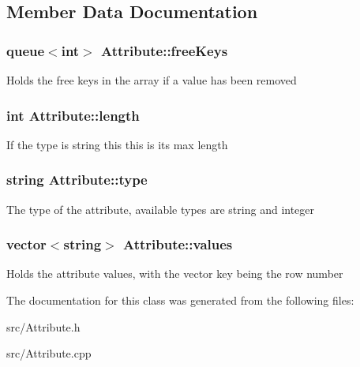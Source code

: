 \subsection{Member Data Documentation}
\hypertarget{class_attribute_a0b0da13208f7c429f72e766c977f9e40}{
\subsubsection[{free\-Keys}]{\setlength{\rightskip}{0pt plus 5cm}queue$<$int$>$ Attribute\-::free\-Keys\hspace{0.3cm}{\ttfamily [private]}}}\label{class_attribute_a0b0da13208f7c429f72e766c977f9e40}
Holds the free keys in the array if a value has been removed \hypertarget{class_attribute_ace310d0f9b59ecde4923c401852112d0}{
\subsubsection[{length}]{\setlength{\rightskip}{0pt plus 5cm}int Attribute\-::length\hspace{0.3cm}{\ttfamily [private]}}}\label{class_attribute_ace310d0f9b59ecde4923c401852112d0}
If the type is {\ttfamily string} this this is its max length \hypertarget{class_attribute_abc17bc58ec6c45b21533ee2194bf2516}{
\subsubsection[{type}]{\setlength{\rightskip}{0pt plus 5cm}string Attribute\-::type\hspace{0.3cm}{\ttfamily [private]}}}\label{class_attribute_abc17bc58ec6c45b21533ee2194bf2516}
The type of the attribute, available types are {\ttfamily string} and {\ttfamily integer} \hypertarget{class_attribute_ae3eb3292f5ddc91f6c2c0152edf625fb}{
\subsubsection[{values}]{\setlength{\rightskip}{0pt plus 5cm}vector$<$string$>$ Attribute\-::values\hspace{0.3cm}{\ttfamily [private]}}}\label{class_attribute_ae3eb3292f5ddc91f6c2c0152edf625fb}
Holds the attribute values, with the vector key being the row number 

The documentation for this class was generated from the following files\-:\begin{DoxyCompactItemize}
\item 
src/Attribute.\-h\item 
src/Attribute.\-cpp\end{DoxyCompactItemize}
